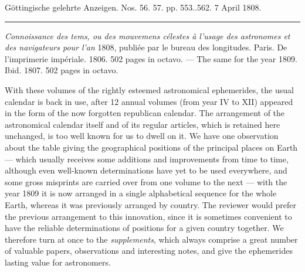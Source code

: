 \clearpage
{}
\hypertarget{native-497-lower}{}\label{native-497-lower}
\begin{center}
\small Göttingische gelehrte Anzeigen. Nos. 56. 57. pp. 553..562. 7 April 1808.\\[3pt]
\rule{.72\linewidth}{.3pt}
\end{center}

\emph{Connoissance des tems, ou des mouvemens célestes à l'usage des astronomes et des navigateurs pour l'an} 1808, publiée par le bureau des longitudes. Paris. De l'imprimerie impériale. 1806. 502 pages in octavo. --- The same for the year 1809. Ibid. 1807. 502 pages in octavo.

With these volumes of the rightly esteemed astronomical ephemerides, the usual calendar is back in use, after 12 annual volumes (from year IV to XII) appeared in the form of the now forgotten republican calendar. The arrangement of the astronomical calendar itself and of its regular articles, which is retained here unchanged, is too well known for us to dwell on it. We have one observation about the table giving the geographical positions of the principal places on Earth --- which usually receives some additions and improvements from time to time, although even well-known
determinations have yet to be used everywhere, and some gross misprints are carried over from one volume to the next --- with the year 1809 it is now arranged in a single alphabetical sequence for the whole Earth, whereas it was previously arranged by country. The reviewer would prefer the previous arrangement to this innovation, since it is sometimes convenient to have the reliable determinations of positions for a given country together. We therefore turn at once to the \emph{supplements}, which always comprise a great number of valuable papers, observations and interesting notes, and give the ephemerides lasting value for astronomers.

